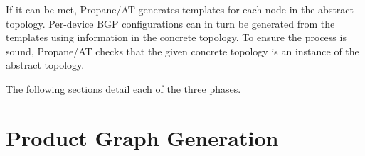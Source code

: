 \documentclass[numbers, 10pt, preprint]{sigplanconf}
\newcommand{\ryan}[1]{\textcolor{green}{[ryan: #1]}}
\newcommand{\sysname}{{\text{}\small \sf Propane/AT}\xspace}
\begin{document}
%

If it can be met, \sysname generates templates for each node in the abstract topology.  Per-device BGP configurations can in turn be generated from the templates
using information in the concrete topology. To ensure the process is sound,
\sysname checks that the given concrete topology is an instance of the abstract topology.

The following sections detail each of the three phases.

%
%
%


%
%
%
%

\section{Product Graph Generation}
\label{sec:language}
\end{document}
